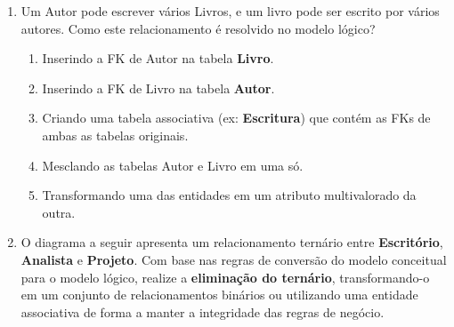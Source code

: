 \documentclass[12pt,a4paper]{article}
\begin{document}
\begin{enumerate}
\begin{enumerate}[label=\Alph*)]
\end{enumerate}

\vspace{0.8cm}

    \item Um Autor pode escrever vários Livros, e um livro pode ser escrito por vários autores. Como este relacionamento é resolvido no modelo lógico?
    \begin{enumerate}[label=\Alph*)]
        \item Inserindo a FK de Autor na tabela \textbf{Livro}.
        \item Inserindo a FK de Livro na tabela \textbf{Autor}.
        \item Criando uma tabela associativa (ex: \textbf{Escritura}) que contém as FKs de ambas as tabelas originais.
        \item Mesclando as tabelas Autor e Livro em uma só.
        \item Transformando uma das entidades em um atributo multivalorado da outra.
    \end{enumerate}


\vspace{0.8cm}

 \item O diagrama a seguir apresenta um relacionamento ternário entre \textbf{Escritório}, \textbf{Analista} e \textbf{Projeto}. Com base nas regras de conversão do modelo conceitual para o modelo lógico, realize a \textbf{eliminação do ternário}, transformando-o em um conjunto de relacionamentos binários ou utilizando uma entidade associativa de forma a manter a integridade das regras de negócio.

\begin{center}
\end{center}
\end{enumerate}
\end{document}
